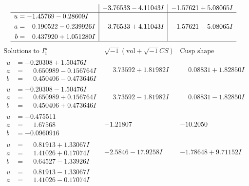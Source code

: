\documentclass[1p]{elsarticle_modified}
\theoremstyle{definition}
\newcommand{\I}{\sqrt{-1}}
\begin{document}
$$\begin{array}{c|c|c}
 & -3.76533 - 4.11043 I & -1.57621 + 5.08065 I \\ \hline\begin{aligned}
u &= -1.45769 - 0.28609 I \\
a &= \phantom{-}0.190522 - 0.239926 I \\
b &= \phantom{-}0.437920 + 1.051280 I\end{aligned}
 & -3.76533 + 4.11043 I & -1.57621 - 5.08065 I\\
 \hline 
 \end{array}$$\newpage$$\begin{array}{c|c|c}  
\text{Solutions to }I^u_{1}& \I (\text{vol} + \sqrt{-1}CS) & \text{Cusp shape}\\
 \hline 
\begin{aligned}
u &= -0.20308 + 1.50476 I \\
a &= \phantom{-}0.650989 - 0.156764 I \\
b &= \phantom{-}0.450406 - 0.473646 I\end{aligned}
 & \phantom{-}3.73592 + 1.81982 I & \phantom{-}0.08831 + 1.82850 I \\ \hline\begin{aligned}
u &= -0.20308 - 1.50476 I \\
a &= \phantom{-}0.650989 + 0.156764 I \\
b &= \phantom{-}0.450406 + 0.473646 I\end{aligned}
 & \phantom{-}3.73592 - 1.81982 I & \phantom{-}0.08831 - 1.82850 I \\ \hline\begin{aligned}
u &= -0.475511\phantom{ +0.000000I} \\
a &= \phantom{-}1.67568\phantom{ +0.000000I} \\
b &= -0.0960916\phantom{ +0.000000I}\end{aligned}
 & -1.21807\phantom{ +0.000000I} & -10.2050\phantom{ +0.000000I} \\ \hline\begin{aligned}
u &= \phantom{-}0.81913 + 1.33067 I \\
a &= \phantom{-}1.41026 + 0.17074 I \\
b &= \phantom{-}0.64527 - 1.33926 I\end{aligned}
 & -2.5846 - 17.9258 I & -1.78648 + 9.71152 I \\ \hline\begin{aligned}
u &= \phantom{-}0.81913 - 1.33067 I \\
a &= \phantom{-}1.41026 - 0.17074 I \\

\end{aligned}
\end{array}$$
\end{document}
